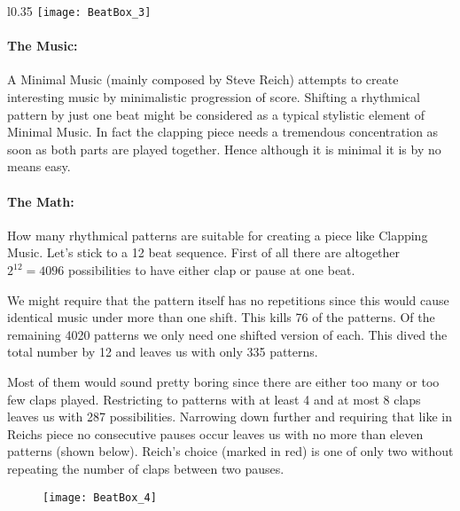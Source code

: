 \begin{wrapfigure}{l}{0.35\textwidth}
\centering
\texttt{[image: BeatBox\_3]}
\end{wrapfigure}
\paragraph{The Music:}
A Minimal Music (mainly composed by Steve Reich) attempts to create interesting music by minimalistic progression of score. Shifting a rhythmical pattern by just one beat might be considered as a typical stylistic element of Minimal Music. In fact the clapping piece needs a tremendous concentration as soon as both parts are played together. Hence although it is minimal it is by no means easy.

\paragraph{The Math:} How many rhythmical patterns are suitable for creating a piece like Clapping Music. Let's stick to a 12 beat sequence. First of all there are altogether $2^{12} = 4096$ possibilities to have either clap or pause at one beat. 

We might require that the pattern itself has no repetitions since this would cause identical music under more than one shift. This kills 76 of the patterns. Of the remaining 4020 patterns we only need one shifted version of each. This dived the total number by 12 and leaves us with only 335 patterns.  


Most of them would sound pretty boring since there are either too many or too few claps played. Restricting to patterns with at least 4 and at most 8 claps leaves us with 287 possibilities. Narrowing down further and requiring that like in Reichs piece no consecutive pauses occur leaves us with no more than eleven patterns (shown below). Reich's choice (marked in red) is one of only two without repeating the number of claps between two pauses.

\begin{figure}[h]
\centering
\texttt{[image: BeatBox\_4]}
\end{figure}

%
%

